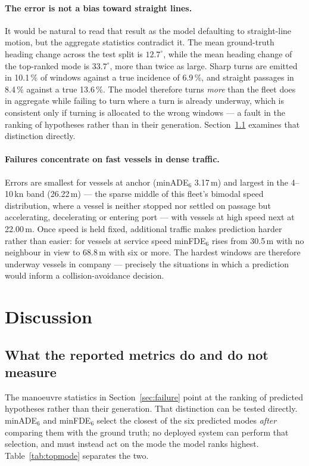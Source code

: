\documentclass[12pt, a4paper]{article}
\begin{document}
  \paragraph{The error is not a bias toward straight lines.}
  It would be natural to read that result as the model defaulting to straight-line
  motion, but the aggregate statistics contradict it.  The mean ground-truth
  heading change across the test split is $12.7^{\circ}$, while the mean heading
  change of the top-ranked mode is $33.7^{\circ}$, more than twice as large.
  Sharp turns are emitted in 10.1\,\% of windows against a true incidence of
  6.9\,\%, and straight passages in 8.4\,\% against a true 13.6\,\%.  The model
  therefore turns \emph{more} than the fleet does in aggregate while failing to
  turn where a turn is already underway, which is consistent only if turning is
  allocated to the wrong windows --- a fault in the ranking of hypotheses rather
  than in their generation.  Section~\ref{sec:metric_limitation} examines that
  distinction directly.

  \paragraph{Failures concentrate on fast vessels in dense traffic.}
  Errors are smallest for vessels at anchor (minADE$_6$ 3.17\,m) and largest in
  the 4--10\,kn band (26.22\,m) --- the sparse middle of this fleet's bimodal speed
  distribution, where a vessel is neither stopped nor settled on passage but
  accelerating, decelerating or entering port --- with vessels at high speed next
  at 22.00\,m.  Once speed is held fixed, additional traffic makes prediction
  harder rather than easier: for vessels at service speed minFDE$_6$
  rises from 30.5\,m with no neighbour in view to 68.8\,m with six or more.  The
  hardest windows are therefore underway vessels in company --- precisely the
  situations in which a prediction would inform a collision-avoidance decision.

  \section{Discussion}
  \label{sec:discussion}

  \subsection{What the reported metrics do and do not measure}
  \label{sec:metric_limitation}
  The manoeuvre statistics in Section~\ref{sec:failure} point at the ranking of
  predicted hypotheses rather than their generation.  That distinction can be
  tested directly.  minADE$_6$ and minFDE$_6$ select the
  closest of the six predicted modes \emph{after} comparing them with the ground
  truth; no deployed system can perform that selection, and must instead act on
  the mode the model ranks highest.  Table~\ref{tab:topmode} separates the two.
\end{document}
